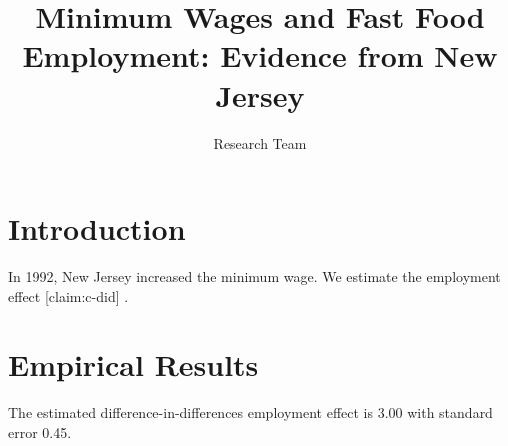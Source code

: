 \documentclass{article}
\newcommand{\result}[2]{#2}
\begin{document}
\title{Minimum Wages and Fast Food Employment: Evidence from New Jersey}
\author{Research Team}
\maketitle
\section{Introduction}
In 1992, New Jersey increased the minimum wage. We estimate the employment effect [claim:c-did] \cite{card1994}.
\section{Empirical Results}
The estimated difference-in-differences employment effect is \result{primary.estimate}{3.00}
with standard error \result{primary.std_error}{0.45}.



\end{document}
